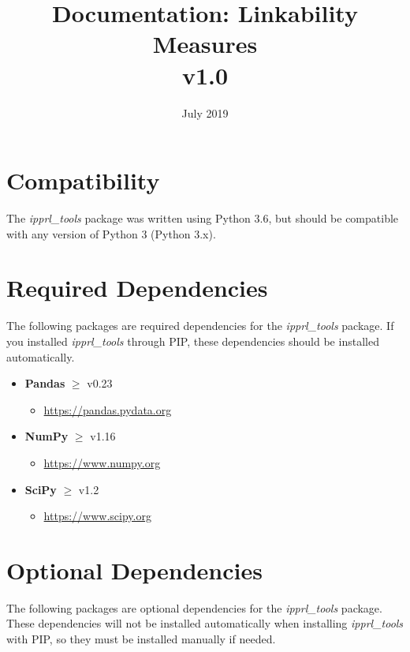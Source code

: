 \documentclass[titlepage, 11pt]{article}
\title{\pkgname{} Documentation: Linkability Measures\\v1.0}
\date{July 2019}
\newcommand{\pkgname}{\textit{ipprl\_tools}}
\begin{document}
\maketitle

\tableofcontents
\section{Compatibility}
The \pkgname{} package was written using Python 3.6, but should be compatible with any version of Python 3 (Python 3.x).

\section{Required Dependencies}
The following packages are required dependencies for the \pkgname{} package. If you installed \pkgname{} through PIP, these dependencies should be installed automatically.

    \begin{itemize}
        \item \textbf{Pandas} $\geq$ v0.23
        \begin{itemize}
            \item \url{https://pandas.pydata.org}
        \end{itemize}
        \item \textbf{NumPy} $\geq$ v1.16
        \begin{itemize}
            \item \url{https://www.numpy.org}
        \end{itemize}
        \item \textbf{SciPy} $\geq$ v1.2
        \begin{itemize}
            \item \url{https://www.scipy.org}
        \end{itemize}
    \end{itemize}

\section{Optional Dependencies}
The following packages are optional dependencies for the \pkgname{} package. These dependencies will not be installed automatically when installing \pkgname{} with PIP, so they must be installed manually if needed.
\end{document}
